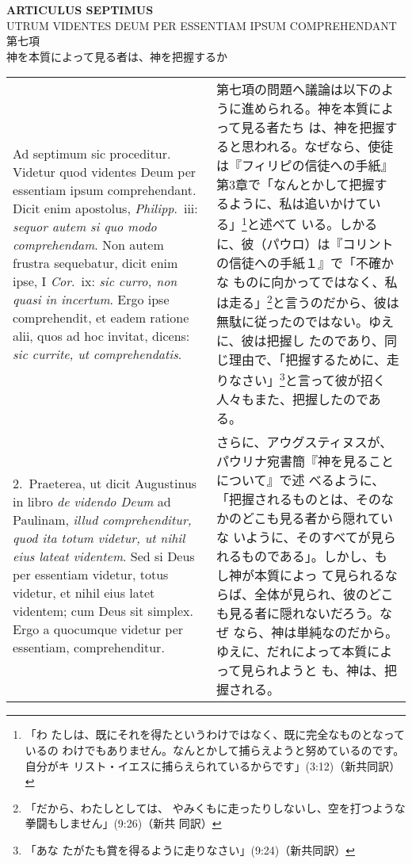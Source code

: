 \documentclass[10pt]{jsarticle} %
\begin{document}
\begin{center}
 {\Large {\bf ARTICULUS SEPTIMUS}}\\
{\large UTRUM VIDENTES DEUM PER ESSENTIAM IPSUM COMPREHENDANT\\
第七項\\
神を本質によって見る者は、神を把握するか}
\end{center}
\begin{longtable}{p{21em}p{21em}}
{\sc \large Ad septimum sic proceditur}. Videtur quod videntes Deum
 per essentiam ipsum comprehendant. Dicit enim apostolus, {\it
 Philipp}.\ {\sc iii}: {\it sequor autem si quo modo
 comprehendam}. Non autem frustra sequebatur, dicit enim ipse, I {\it
 Cor}.\ {\sc ix}: {\it sic curro, non quasi in incertum}. Ergo ipse
 comprehendit, et eadem ratione alii, quos ad hoc invitat, dicens:
 {\it sic currite, ut comprehendatis}.

&

第七項の問題へ議論は以下のように進められる。神を本質によって見る者たち
は、神を把握すると思われる。なぜなら、使徒は『フィリピの信徒への手紙』
第3章で「なんとかして把握するように、私は追いかけている」\footnote{「わ
たしは、既にそれを得たというわけではなく、既に完全なものとなっているの
わけでもありません。なんとかして捕らえようと努めているのです。自分がキ
リスト・イエスに捕らえられているからです」(3:12)（新共同訳）}と述べて
いる。しかるに、彼（パウロ）は『コリントの信徒への手紙１』で「不確かな
ものに向かってではなく、私は走る」\footnote{「だから、わたしとしては、
やみくもに走ったりしないし、空を打つような拳闘もしません」(9:26)（新共
同訳）}と言うのだから、彼は無駄に従ったのではない。ゆえに、彼は把握し
たのであり、同じ理由で、「把握するために、走りなさい」\footnote{「あな
たがたも賞を得るように走りなさい」(9:24)（新共同訳）}と言って彼が招く
人々もまた、把握したのである。

\\

2.~{\sc  Praeterea}, ut dicit Augustinus in libro {\it de videndo Deum}
 ad Paulinam, {\it illud comprehenditur, quod ita totum videtur, ut nihil
 eius lateat videntem}. Sed si Deus per essentiam videtur, totus videtur,
 et nihil eius latet videntem; cum Deus sit simplex. Ergo a quocumque
 videtur per essentiam, comprehenditur.

&

さらに、アウグスティヌスが、パウリナ宛書簡『神を見ることについて』で述
べるように、「把握されるものとは、そのなかのどこも見る者から隠れていな
いように、そのすべてが見られるものである」。しかし、もし神が本質によっ
て見られるならば、全体が見られ、彼のどこも見る者に隠れないだろう。なぜ
なら、神は単純なのだから。ゆえに、だれによって本質によって見られようと
も、神は、把握される。


\end{longtable}
\end{document}
